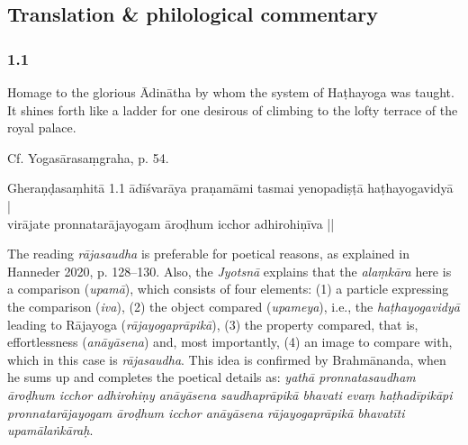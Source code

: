 


\pagestyle{HPed}
\begin{ekdosis}

\chapter*{Translation \& philological commentary}
\subsection*{1.1}
\begin{translation}[hp01_001]
Homage to the glorious Ādinātha by whom the system of Haṭhayoga was taught. It shines forth like a ladder for one desirous of climbing to the lofty terrace of the royal palace.
\end{translation}

\begin{testimonia}[hp01_001]
Cf. Yogasārasaṃgraha, p. 54.

\begin{versinnote}
\end{versinnote}

Gheraṇḍasaṃhitā 1.1
\startverse
ādīśvarāya praṇamāmi tasmai yenopadiṣṭā haṭhayogavidyā | \\
virājate pronnatarājayogam āroḍhum icchor adhirohiṇīva ||
\endverse
\end{testimonia}

\begin{philcomm}[hp01_001]
The reading \emph{rājasaudha} is preferable for poetical reasons, as explained in Hanneder 2020, p. 128–130. Also, the \emph{Jyotsnā} explains that the \emph{alaṃkāra} here is a comparison (\emph{upamā}), which consists of four elements: (1) a particle expressing the comparison
(\emph{iva}), (2) the object compared (\emph{upameya}), i.e., the \emph{haṭhayogavidyā} leading to Rājayoga (\emph{rājayogaprāpikā}), (3) the property compared, that is, effortlessness (\emph{anāyāsena}) and, most importantly, (4) an image to compare with, which in this case is \emph{rājasaudha}. This idea is confirmed by Brahmānanda, when he sums up and completes the poetical details as: \emph{yathā pronnatasaudham āroḍhum icchor adhirohiṇy anāyāsena saudhaprāpikā bhavati evaṃ haṭhadīpikāpi pronnatarājayogam āroḍhum icchor anāyāsena rājayogaprāpikā bhavatīti upamālaṅkāraḥ}.


\end{philcomm}
\end{ekdosis}
